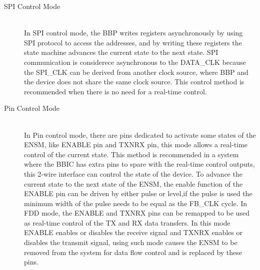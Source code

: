 \begin{description}
	\item[SPI Control Mode] \hfill \\
	In SPI control mode, the BBP writes registers asynchronously by using SPI protocol to access the addresses, and by writing these registers the state machine advances the current state to the next state. SPI communication is considerece asynchronous to the DATA\_CLK because the SPI\_CLK can be derived from another clock source, where BBP and the device does not share the same clock source. This control method is recommended when there is no need for a real-time control.

	\item[Pin Control Mode] \hfill \\
	In Pin control mode, there are pins dedicated to activate some states of the ENSM, like ENABLE pin and TXNRX pin, this mode allows a real-time control of the current state. This method is recommended in a system where the BBIC has extra pins to spare with the real-time control outputs, this 2-wire interface can control the state of the device.
	To advance the current state to the next state of the ENSM, the enable function of the ENABLE pin can be driven by either pulse or level,if the pulse is used the minimum width of the pulse needs to be equal as the FB\_CLK cycle.
	In FDD mode, the ENABLE and TXNRX pins can be remapped to be used as real-time control of the TX and RX data transfers. In this mode ENABLE enables or disables the receive signal and TXNRX enables or disables the transmit signal, using such mode  causes the ENSM to be removed from the system for data flow control and is replaced by these pins.

\end{description}

